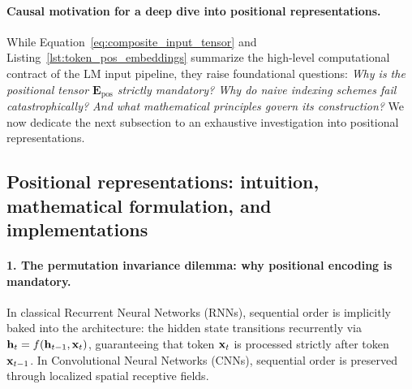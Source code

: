 \documentclass[../../main.tex]{subfiles}
\begin{document}
\paragraph{Causal motivation for a deep dive into positional representations.}
While Equation~\eqref{eq:composite_input_tensor} and Listing~\ref{lst:token_pos_embeddings} summarize the high-level computational contract of the LM input pipeline, they raise foundational questions: \emph{Why is the positional tensor $\mathbf{E}_{\text{pos}}$ strictly mandatory? Why do naive indexing schemes fail catastrophically? And what mathematical principles govern its construction?} We now dedicate the next subsection to an exhaustive investigation into positional representations.

\subsection{Positional representations: intuition, mathematical formulation, and implementations}
\label{subsec:positional_representations_deep}

\paragraph{1. The permutation invariance dilemma: why positional encoding is mandatory.}
In classical Recurrent Neural Networks (RNNs), sequential order is implicitly baked into the architecture: the hidden state transitions recurrently via $\mathbf{h}_t = f(\mathbf{h}_{t-1}, \mathbf{x}_t)$, guaranteeing that token $\mathbf{x}_t$ is processed strictly after token $\mathbf{x}_{t-1}$. In Convolutional Neural Networks (CNNs), sequential order is preserved through localized spatial receptive fields.
\end{document}
